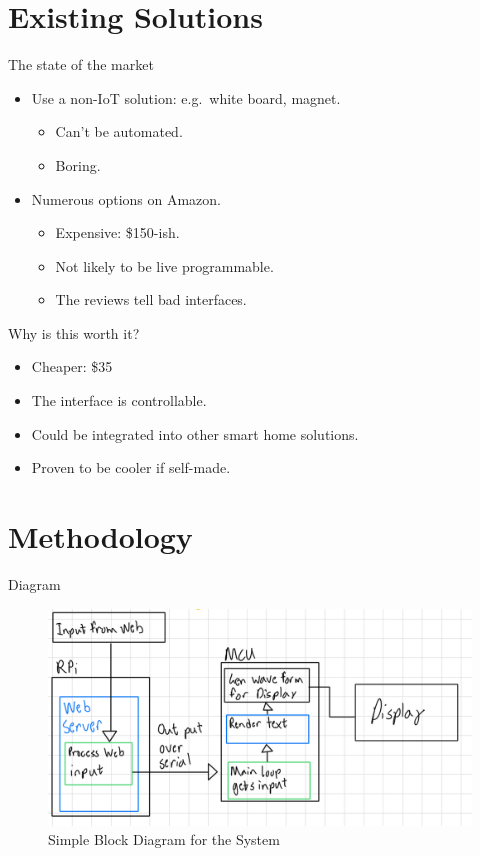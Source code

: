 \documentclass[10pt]{beamer}
\begin{document}
\section{Existing Solutions}

\begin{frame}{The state of the market}
  \Large
  \begin{itemize}
    \item Use a non-IoT solution: e.g.\ white board, magnet.
      \large
      \begin{itemize}
        \item Can't be automated.
        \item Boring.
      \end{itemize}
    \item Numerous options on Amazon.
      \large
      \begin{itemize}
        \item Expensive: \$150-ish.
        \item Not likely to be live programmable.
        \item The reviews tell bad interfaces.
      \end{itemize}
  \end{itemize}
\end{frame}

\begin{frame}{Why is this worth it?}
  \Large
  \begin{itemize}
    \item Cheaper: \$35
    \item The interface is controllable.
    \item Could be integrated into other smart home solutions.
    \item Proven to be cooler if self-made.
  \end{itemize}
\end{frame}

\section{Methodology}

\begin{frame}{Diagram}
  \begin{figure}
    \centering
    \includegraphics[width=\textwidth]{figures/tot_block_dia.png}
    \caption{Simple Block Diagram for the System}
  \end{figure}
\end{frame}
\end{document}
